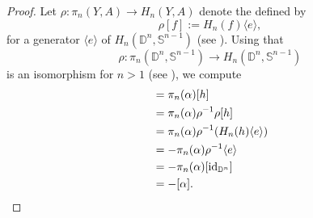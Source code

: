 \begin{proof}
 	Let $\rho : \pi_n(Y,A) \to H_n(Y,A)$ denote the  defined by
	\begin{equation*}
		\rho[f] := H_n(f)\langle e \rangle,
	\end{equation*}
	\noindent for a generator $\langle e \rangle$ of $H_n(\mathbb{D}^n,\mathbb{S}^{n - 1})$ (see \cite[166]{whitehead:homotopy_theory:1978}). Using that 
	\begin{equation*}
		\rho : \pi_n(\mathbb{D}^n,\mathbb{S}^{n - 1}) \to H_n(\mathbb{D}^n,\mathbb{S}^{n - 1})
	\end{equation*}
	\noindent is an isomorphism for $n >1$ (see \cite[168]{whitehead:homotopy_theory:1978}), we compute
	\begin{align*}
		[\alpha \circ h] &= \pi_n(\alpha)[h]\\
		&= \pi_n(\alpha)\rho^{-1}\rho[h]\\ 
		&= \pi_n(\alpha)\rho^{-1}(H_n(h)\langle e \rangle)\\
		&= -\pi_n(\alpha)\rho^{-1}\langle e \rangle\\
		&= -\pi_n(\alpha)[\id_{\mathbb{D}^n}]\\
		&= - [\alpha].
	\end{align*}
\end{proof}

